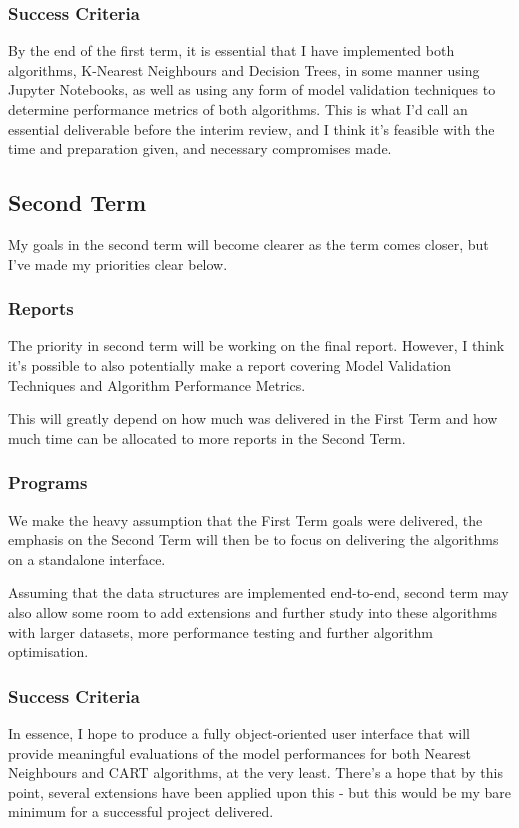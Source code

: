 \documentclass[report,10pt]{article}
\begin{document}
\subsubsection{Success Criteria}
By the end of the first term, it is essential that I have implemented both algorithms, K-Nearest Neighbours and 
Decision Trees, in some manner using Jupyter Notebooks, as well as using any form of model validation techniques to determine performance metrics of both algorithms. This is what I'd call an essential deliverable before the interim review, and I think it's feasible with the time and preparation given, and necessary compromises made.

\subsection{Second Term}
My goals in the second term will become clearer as the term comes closer, but I've made my priorities clear below.
\subsubsection{Reports}
The priority in second term will be working on the final report. However, I think it's possible to also potentially make a report covering Model Validation Techniques and Algorithm Performance Metrics. \par
This will greatly depend on how much was delivered in the First Term and how much time can be allocated to more reports in the Second Term.

\subsubsection{Programs}
We make the heavy assumption that the First Term goals were delivered, the emphasis on the Second Term will then be to focus on delivering the algorithms on a standalone interface. \par
Assuming that the data structures are implemented end-to-end, second term may also allow some room to add extensions and further study into these algorithms with larger datasets, more performance testing and further algorithm optimisation.
\subsubsection{Success Criteria}
In essence, I hope to produce a fully object-oriented user interface that will provide meaningful evaluations of the model performances for both Nearest Neighbours and CART algorithms, at the very least. There's a hope that by this point, several extensions have been applied upon this - but this would be my bare minimum for a successful project delivered. 
\pagebreak
\end{document}
